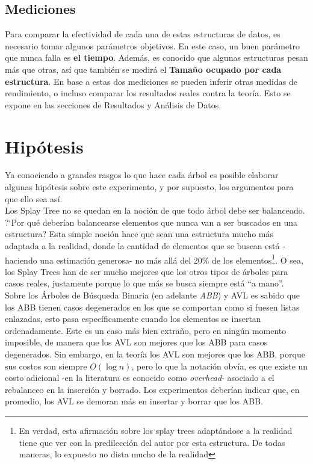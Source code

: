 \documentclass[12pt,letterpaper]{report}
\begin{document}
\subsection{Mediciones}
\label{subsec:mediciones}

Para comparar la efectividad de cada una de estas estructuras de datos, es necesario tomar algunos parámetros objetivos. En este caso, un buen parámetro que nunca falla es \textbf{el tiempo}. Además, es conocido que algunas estructuras pesan más que otras, así que también se medirá el \textbf{Tamaño ocupado por cada estructura}. En base a estas dos mediciones se pueden inferir otras medidas de rendimiento, o incluso comparar los resultados reales contra la teoría. Esto se expone en las secciones de Resultados y Análisis de Datos.

\newpage
\section{Hipótesis}
Ya conociendo a grandes rasgos lo que hace cada árbol es posible elaborar algunas hipótesis sobre este experimento, y por supuesto, los argumentos para que ello sea así.\\

Los Splay Tree no se quedan en la noción de que todo árbol debe ser balanceado. ?`Por qué deberían balancearse elementos que nunca van a ser buscados en una estructura? Esta simple noción hace que sean una estructura mucho más adaptada a la realidad, donde la cantidad de elementos que se buscan está -haciendo una estimación generosa- no más allá del 20\% de los elementos\footnote{En verdad, esta afirmación sobre los splay trees adaptándose a la realidad tiene que ver con la predilección del autor por esta estructura. De todas maneras, lo expuesto no dista mucho de la realidad}. O sea, los Splay Trees han de ser mucho mejores que los otros tipos de árboles para casos reales, justamente porque lo que más se busca siempre está ``a mano''.\\

Sobre los Árboles de Búsqueda Binaria (en adelante \emph{ABB}) y AVL es sabido que los ABB tienen casos degenerados en los que se comportan como si fuesen listas enlazadas, esto pasa específicamente cuando los elementos se insertan ordenadamente. Este es un caso más bien extraño, pero en ningún momento imposible, de manera que los AVL son mejores que los ABB para casos degenerados. Sin embargo, en la teoría los AVL son mejores que los ABB, porque sus costos son siempre $O(\log n)$, pero lo que la notación obvía, es que existe un costo adicional -en la literatura es conocido como \emph{overhead}- asociado a el rebalanceo en la inserción y borrado. Los experimentos deberían indicar que, en promedio, los AVL se demoran más en insertar y borrar que los ABB.\\
\end{document}
